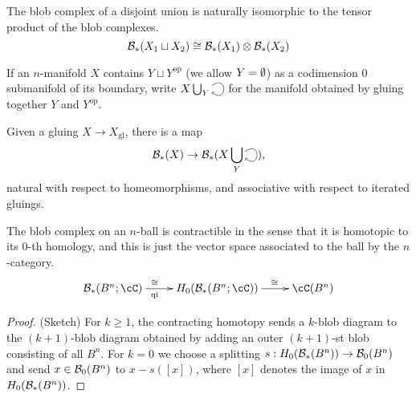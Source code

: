 \documentclass{pnastwo}
\begin{document}
\begin{article}
\begin{property}
\label{property:disjoint-union}
The blob complex of a disjoint union is naturally isomorphic to the tensor product of the blob complexes.
\begin{equation*}
{\mathcal B}_*(X_1 \sqcup X_2) \cong {\mathcal B}_*(X_1) \otimes {\mathcal B}_*(X_2)
\end{equation*}
\end{property}

If an $n$-manifold $X$ contains $Y \sqcup Y^\text{op}$ (we allow $Y = \emptyset$) as a codimension $0$ submanifold of its boundary, 
write $X \bigcup_{Y}\selfarrow$ for the manifold obtained by gluing together $Y$ and $Y^\text{op}$.
\begin{property}
\label{property:gluing-map}%
Given a gluing $X \to X_\mathrm{gl}$, there is
a map
\[
	\bc_*(X) \to \bc_*(X \bigcup_{Y}\selfarrow),
\]
natural with respect to homeomorphisms, and associative with respect to iterated gluings.
\end{property}

\begin{property}[Contractibility]
\label{property:contractibility}%
The blob complex on an $n$-ball is contractible in the sense 
that it is homotopic to its $0$-th homology, and this is just the vector space associated to the ball by the $n$-category.
\begin{equation*}
\xymatrix{\bc_*(B^n;\cC) \ar[r]^(0.4){\iso}_(0.4){\text{qi}} & H_0(\bc_*(B^n;\cC)) \ar[r]^(0.6)\iso & \cC(B^n)}
\end{equation*}
\end{property}

\begin{proof}(Sketch)
For $k\ge 1$, the contracting homotopy sends a $k$-blob diagram to the $(k{+}1)$-blob diagram
obtained by adding an outer $(k{+}1)$-st blob consisting of all $B^n$.
For $k=0$ we choose a splitting $s: H_0({\mathcal B}_*(B^n)) \to {\mathcal B}_0(B^n)$ and send 
$x\in {\mathcal B}_0(B^n)$ to $x - s([x])$, where $[x]$ denotes the image of $x$ in $H_0({\mathcal B}_*(B^n))$.
\end{proof}


\end{article}
\end{document}
